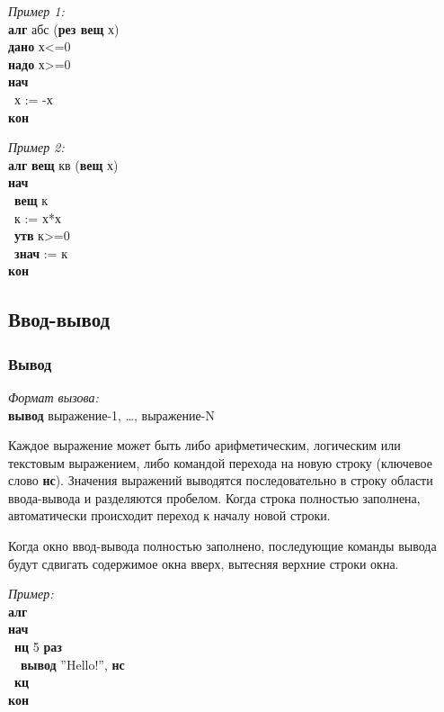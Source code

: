 \documentclass[12pt,a4paper]{article}
\newcommand{\otstup}{\textperiodcentered\ }
\begin{document}
\emph{Пример 1:}\\
{\sffamily
\textbf{алг} абс (\textbf{рез вещ} х)\\
\textbf{дано} х<=0\\
\textbf{надо} х>=0\\
\textbf{нач}\\
\otstup х := -х\\
\textbf{кон}
}

\emph{Пример 2:}\\
{\sffamily
\textbf{алг} \textbf{вещ} кв (\textbf{вещ} х)\\
\textbf{нач}\\
\otstup \textbf{вещ} к\\
\otstup к := х*х\\
\otstup \textbf{утв} к>=0\\
\otstup \textbf{знач} := к\\
\textbf{кон}
}

\subsection{Ввод-вывод}

\subsubsection{Вывод}

\emph{Формат вызова:}\\
\textsf{\textbf{вывод} выражение-1, \dots, выражение-N}
	
	Каждое выражение может быть либо арифметическим, логическим или текстовым выражением, либо командой перехода на новую строку (ключевое слово \textbf{нс}). Значения выражений выводятся последовательно в строку области ввода-вывода и разделяются пробелом. Когда строка полностью заполнена, автоматически происходит переход к началу новой строки. 

	Когда окно ввод-вывода полностью заполнено, последующие команды вывода будут сдвигать содержимое окна вверх, вытесняя верхние строки окна. 

\emph{Пример:}\\
{\sffamily
\textbf{алг}\\
\textbf{нач}\\
\otstup \textbf{нц} 5 \textbf{раз}\\
\otstup \otstup \textbf{вывод} ''Hello!'', \textbf{нс}\\
\otstup \textbf{кц}\\
\textbf{кон}
}
\end{document}
